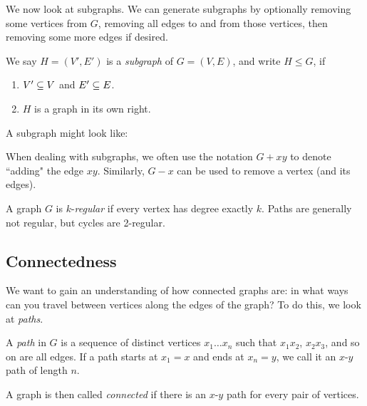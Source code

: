 \documentclass{article}
\begin{document}
We now look at subgraphs. We can generate subgraphs by optionally removing some vertices from $G$, removing all edges to and from those vertices, then removing some more edges if desired.

\begin{definition}[Subgraph]
    We say $H = (V', E')$ is a \textit{subgraph} of $G = (V, E)$, and write $H \leq G$, if
    \begin{enumerate}
        \item $V' \subseteq V$ and $E' \subseteq E$.
        \item $H$ is a graph in its own right.
    \end{enumerate}
\end{definition}

\begin{example}[Subgraph]
    A subgraph might look like:

\end{example}

When dealing with subgraphs, we often use the notation $G + xy$ to denote ``adding" the edge $x y$. Similarly, $G - x$ can be used to remove a vertex (and its edges).

\begin{definition}[Regularity]
	\label{regular-definition}
    A graph $G$ is $k$-\textit{regular} if every vertex has degree exactly $k$. Paths are generally not regular, but cycles are 2-regular.
\end{definition}


\subsection{Connectedness}

We want to gain an understanding of how connected graphs are: in what ways can you travel between vertices along the edges of the graph? To do this, we look at \textit{paths}.

\begin{definition}[Path]
	\label{path}
    A \textit{path} in $G$ is a sequence of distinct vertices $x_1 \dots x_n$ such that $x_1 x_2$, $x_2 x_3$, and so on are all edges. If a path starts at $x_1 = x$ and ends at $x_n = y$, we call it an $x$-$y$ path of length $n$.
\end{definition}

 A graph is then called \textit{connected} if there is an $x$-$y$ path for every pair of vertices.
\end{document}
